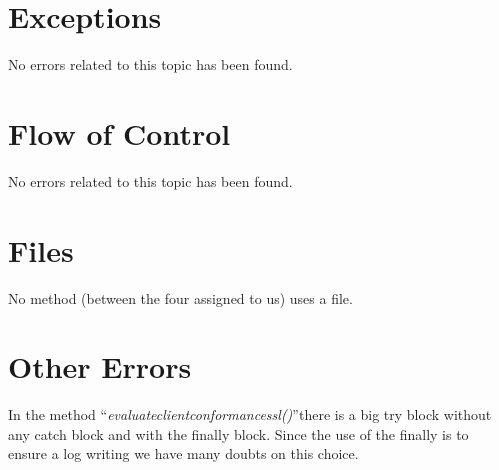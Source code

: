 \documentclass[\mainpath/main]{subfiles}
\begin{document}
\section{Exceptions}
\label{CodeInspectionChecklist:Exceptions}
No errors related to this topic has been found.

\section{Flow of Control}
\label{CodeInspectionChecklist:FlowofControl}
No errors related to this topic has been found.

\section{Files}
\label{CodeInspectionChecklist:Files}
No method (between the four assigned to us) uses a file.

\section{Other Errors}
\label{CodeInspectionChecklist:OtherErrors}
In the method \textquotedblleft \textit{evaluate\textunderscore client\textunderscore conformance\textunderscore ssl(\textellipsis)}\textquotedblright there is a big try block without any catch block and with the finally block. Since the use of the finally is to ensure a log writing we have many doubts on this choice.
\end{document}
